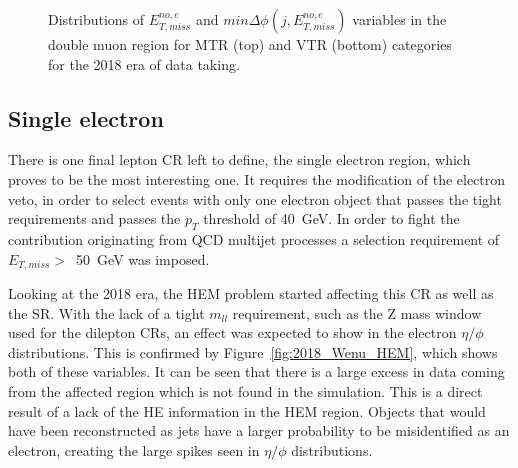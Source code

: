 \begin{figure}[htbp]
{    }
  \caption{Distributions of $E_{T,miss}^{no,e}$ and $min\Delta\phi(j,E_{T,miss}^{no,e})$ variables in the double muon region for MTR (top) and VTR (bottom) categories for the 2018 era of data taking.}
  \label{fig:2018_Zee_2}
\end{figure}


\subsection{Single electron}
\label{sec:single_electron}
\hspace{10pt} There is one final lepton CR left to define, the single electron region, which proves to be the most interesting one. It requires the modification of the electron veto, in order to select events with only one electron object that passes the tight requirements and passes the $p_T$ threshold of 40~GeV. In order to fight the contribution originating from QCD multijet processes a selection requirement of $E_{T,miss}>$~50~GeV was imposed.

\hspace{10pt} Looking at the 2018 era, the HEM problem started affecting this CR as well as the SR. With the lack of a tight $m_{ll}$ requirement, such as the Z mass window used for the dilepton CRs, an effect was expected to show in the electron $\eta/\phi$ distributions. This is confirmed by Figure~\ref{fig:2018_Wenu_HEM}, which shows both of these variables. It can be seen that there is a large excess in data coming from the affected region which is not found in the simulation. This is a direct result of a lack of the HE information in the HEM region. Objects that would have been reconstructed as jets have a larger probability to be misidentified as an electron, creating the large spikes seen in $\eta/\phi$ distributions.

